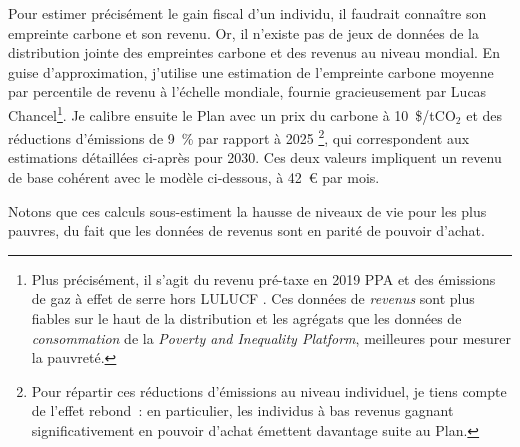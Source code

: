 \documentclass[a5paper,french,openany]{memoir}
\begin{document}
Pour estimer précisément le gain fiscal d'un individu, il faudrait connaître son empreinte carbone et son revenu. Or, il n'existe pas de jeux de données de la distribution jointe des empreintes carbone et des revenus au niveau mondial. En guise d'approximation, j'utilise une estimation de l'empreinte carbone moyenne par percentile de revenu à l'échelle mondiale, fournie gracieusement par Lucas Chancel\footnote{Plus précisément, il s'agit du revenu pré-taxe en \textit{\texteuro{}} 2019 PPA et des émissions de gaz à effet de serre hors LULUCF%
. Ces données de \textit{revenus} sont plus fiables sur le haut de la distribution et les agrégats que les données de \textit{consommation} de la \textit{Poverty and Inequality Platform}, meilleures pour mesurer la pauvreté.%
}. Je calibre ensuite le Plan avec %
un prix du carbone à 10~\$/tCO$_\text{2}$ et des réductions d'émissions de 9~\% par rapport à 2025%
\footnote{Pour répartir ces réductions d'émissions au niveau individuel, je tiens compte de l'effet rebond~: en particulier, les individus à bas revenus gagnant significativement en pouvoir d'achat émettent davantage suite au Plan.}, qui correspondent aux estimations détaillées ci-après pour 2030. Ces deux valeurs impliquent un revenu de base cohérent avec le modèle ci-dessous, à 42~\euro{} par mois. %

Notons que ces calculs sous-estiment la hausse de niveaux de vie pour les plus pauvres, du fait que les données de revenus sont en parité de pouvoir d'achat.
\end{document}
